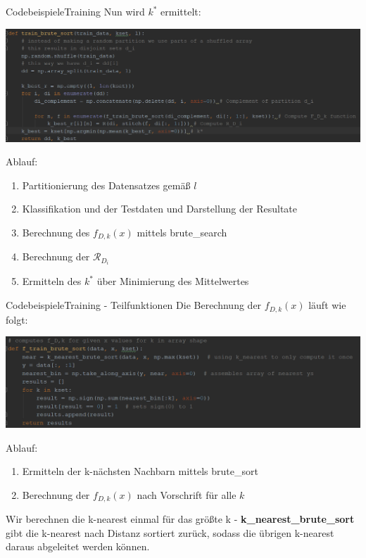 \documentclass[9pt]{beamer}
\begin{document}
\begin{frame}{Codebeispiele}{Training}
Nun wird $k^*$ ermittelt:
\begin{center}
\includegraphics[scale=0.5]{assets/train_brute.png}
\end{center}
Ablauf:
\begin{enumerate}[1.]
\item{Partitionierung des Datensatzes gemäß $l$}
\item{Klassifikation und der Testdaten und Darstellung der Resultate}
\item{Berechnung des $f_{D, k}(x)$ mittels brute\_search}
\item{Berechnung der $\mathcal{R}_{D_i}$}
\item{Ermitteln des $k^*$ über Minimierung des Mittelwertes}
\end{enumerate}
\end{frame}

\begin{frame}{Codebeispiele}{Training - Teilfunktionen}
Die Berechnung der $f_{D, k}(x)$ läuft wie folgt:
\begin{center}
\includegraphics[scale=0.6]{assets/train_brute_sort.png}
\end{center}
Ablauf:
\begin{enumerate}[1.]
\item{Ermitteln der k-nächsten Nachbarn mittels brute\_sort}
\item{Berechnung der $f_{D, k}(x)$ nach Vorschrift für alle $k$}
\end{enumerate}
Wir berechnen die k-nearest einmal für das größte k - \textbf{k\_nearest\_brute\_sort} gibt die k-nearest nach Distanz sortiert zurück, sodass die übrigen k-nearest daraus abgeleitet werden können.
\end{frame}
\end{document}

